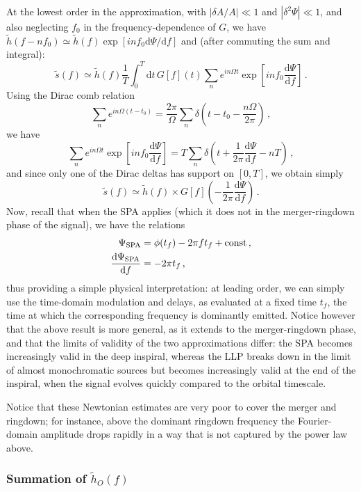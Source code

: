 \documentclass[aps,showpacs,twocolumn,prd,superscriptaddress,nofootinbib]{revtex4}
\newcommand{\be}{\begin{equation}}
\newcommand{\ee}{\end{equation}}
\newcommand\ud{{\mathrm{d}}}
\newcommand{\nn}{\nonumber}
\begin{document}
At the lowest order in the approximation, with $|\delta A/A| \ll 1$ and $|\delta^{2} \Psi | \ll 1$, and also neglecting $f_{0}$ in the frequency-dependence of $G$, we have $\tilde{h}(f-n f_{0}) \simeq \tilde{h}(f) \exp\left[ i n f_{0} \ud \Psi/\ud f \right]$ and (after commuting the sum and integral):
%
\be
	\tilde{s}(f) \simeq \tilde{h}(f) \frac{1}{T} \int_{0}^{T}\ud t\, G[f](t) \sum\limits_{n} e^{i n \Omega t} \exp\left[ i n f_{0} \frac{\ud \Psi}{\ud f} \right] \,.
\ee
%
Using the Dirac comb relation
%
\be
	\sum\limits_{n} e^{i n \Omega (t-t_{0})} = \frac{2\pi}{\Omega} \sum\limits_{n} \delta\left( t-t_{0} - \frac{n\Omega}{2\pi} \right) \,,
\ee
%
we have
%
\be
	\sum\limits_{n} e^{i n \Omega t} \exp\left[ i n f_{0} \frac{\ud \Psi}{\ud f }\right] = T \sum\limits_{n} \delta\left( t + \frac{1}{2\pi}\frac{\ud \Psi}{\ud f} - n T \right) \,,
\ee
%
and since only one of the Dirac deltas has support on $[0,T]$, we obtain simply
%
\be
	\tilde{s}(f) \simeq \tilde{h}(f) \times G[f]\left( -\frac{1}{2\pi} \frac{\ud \Psi}{\ud f} \right)\,.
\ee
%
Now, recall that when the SPA applies (which it does not in the merger-ringdown phase of the signal), we have the relations
%
\begin{align}
	\Psi_{\rm SPA} &= \phi(t_{f}) - 2\pi f t_{f} + \mathrm{const} \,,\nn\\
	\frac{\ud \Psi_{\rm SPA}}{\ud f} &= -2\pi t_{f} \,,
\end{align}
%
thus providing a simple physical interpretation: at leading order, we can simply use the time-domain modulation and delays, as evaluated at a fixed time $t_{f}$, the time at which the corresponding frequency is dominantly emitted. Notice however that the above result is more general, as it extends to the merger-ringdown phase, and that the limits of validity of the two approximations differ: the SPA becomes increasingly valid in the deep inspiral, whereas the LLP breaks down in the limit of almost monochromatic sources but becomes increasingly valid at the end of the inspiral, when the signal evolves quickly compared to the orbital timescale.

Notice that these Newtonian estimates are very poor to cover the merger and ringdown; for instance, above the dominant ringdown frequency the Fourier-domain amplitude drops rapidly in a way that is not captured by the power law above.


\subsubsection*{Summation of $\tilde{h}_{O}\left(f\right)$}
\end{document}
